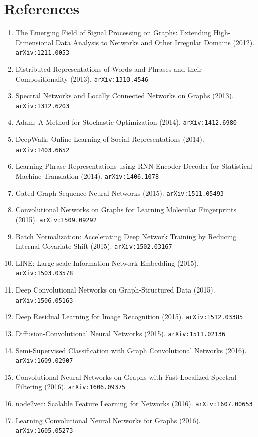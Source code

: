 \documentclass[11pt]{article}
\begin{document}
\section*{References}
\begin{enumerate}\small
  \item The Emerging Field of Signal Processing on Graphs: Extending
  High-Dimensional Data Analysis to Networks and Other Irregular Domains (2012). \texttt{arXiv:1211.0053}
  \item Distributed Representations of Words and Phrases and their
  Compositionality (2013). \texttt{arXiv:1310.4546}
  \item Spectral Networks and Locally Connected Networks on Graphs (2013). \texttt{arXiv:1312.6203}
  \item Adam: A Method for Stochastic Optimization (2014). \texttt{arXiv:1412.6980}
  \item DeepWalk: Online Learning of Social Representations (2014). \texttt{arXiv:1403.6652}
  \item Learning Phrase Representations using RNN Encoder-Decoder for
  Statistical Machine Translation (2014). \texttt{arXiv:1406.1078}
  \item Gated Graph Sequence Neural Networks (2015). \texttt{arXiv:1511.05493}
  \item Convolutional Networks on Graphs for Learning Molecular Fingerprints (2015). \texttt{arXiv:1509.09292}
  \item Batch Normalization: Accelerating Deep Network Training by Reducing
  Internal Covariate Shift (2015). \texttt{arXiv:1502.03167}
  \item LINE: Large-scale Information Network Embedding (2015). \texttt{arXiv:1503.03578}
  \item Deep Convolutional Networks on Graph-Structured Data (2015). \texttt{arXiv:1506.05163}
  \item Deep Residual Learning for Image Recognition (2015). \texttt{arXiv:1512.03385}
  \item Diffusion-Convolutional Neural Networks (2015). \texttt{arXiv:1511.02136}
  \item Semi-Supervised Classification with Graph Convolutional Networks (2016). \texttt{arXiv:1609.02907}
  \item Convolutional Neural Networks on Graphs with Fast Localized Spectral
  Filtering (2016). \texttt{arXiv:1606.09375}
  \item node2vec: Scalable Feature Learning for Networks (2016). \texttt{arXiv:1607.00653}
  \item Learning Convolutional Neural Networks for Graphs (2016). \texttt{arXiv:1605.05273}

\end{enumerate}
\end{document}
